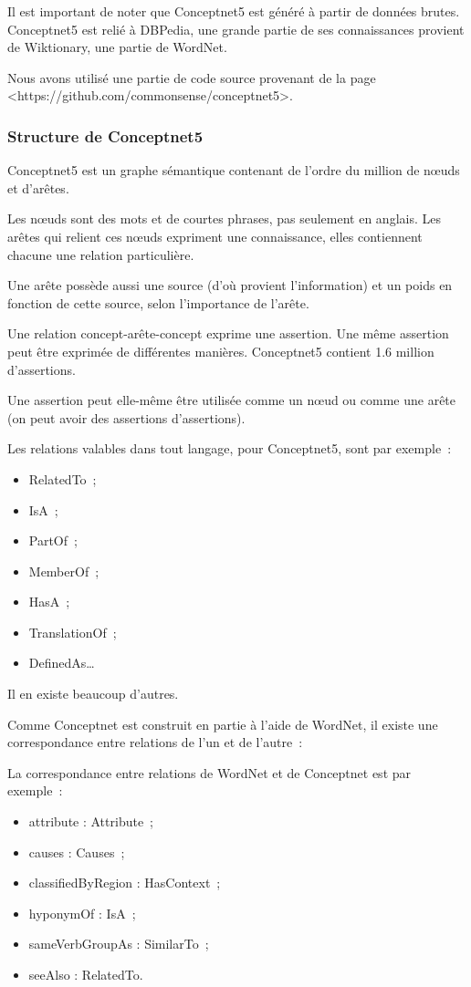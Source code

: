 \documentclass[a4paper, 12pt]{article}
\begin{document}
Il est important de noter que Conceptnet5 est généré à partir de données brutes. Conceptnet5 est relié à DBPedia, une grande partie de ses connaissances provient de Wiktionary, une partie de WordNet.

Nous avons utilisé une partie de code source provenant de la page <https://github.com/commonsense/conceptnet5>.


\subsubsection{Structure de Conceptnet5}

Conceptnet5 est un graphe sémantique contenant de l'ordre du million de nœuds et d'ar\^etes.

Les n\oe{}uds sont des mots et de courtes phrases, pas seulement en anglais. Les arêtes qui relient ces n\oe{}uds expriment une connaissance, elles contiennent chacune une relation particulière.

Une arête possède aussi une source (d'où provient l'information) et un poids en fonction de cette source, selon l'importance de l'arête.

Une relation concept-arête-concept exprime une assertion. Une même assertion peut être exprimée de différentes manières. Conceptnet5 contient 1.6 million d'assertions.

Une assertion peut elle-même être utilisée comme un n\oe{}ud ou comme une arête (on peut avoir des assertions d'assertions).

Les relations valables dans tout langage, pour Conceptnet5, sont par exemple~:
\begin{itemize}
 \item RelatedTo~;
 \item IsA~;
 \item PartOf~;
 \item MemberOf~;
 \item HasA~;
 \item TranslationOf~;
 \item DefinedAs\ldots{}
\end{itemize}

Il en existe beaucoup d'autres.

Comme Conceptnet est construit en partie à l'aide de WordNet, il existe une correspondance entre relations de l'un et de l'autre~:

La correspondance entre relations de WordNet et de Conceptnet est par exemple~:
\begin{itemize}
 \item attribute : Attribute~;
 \item causes : Causes~;
 \item classifiedByRegion : HasContext~;
 \item hyponymOf : IsA~;
 \item sameVerbGroupAs : SimilarTo~;
 \item seeAlso : RelatedTo.
\end{itemize}
\end{document}
